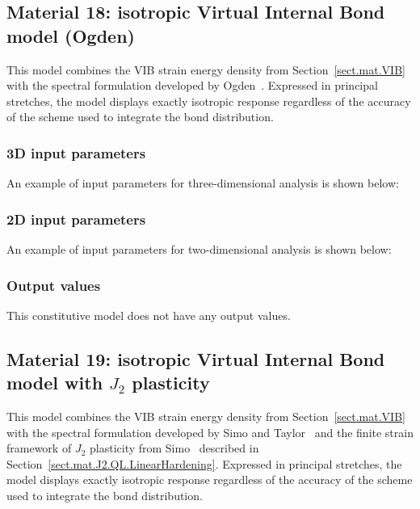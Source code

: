 \subsection{Material 18: isotropic Virtual Internal Bond model (Ogden)}
\label{sect.mat.VIB.Ogden}
This model combines the VIB strain energy density from
Section~\ref{sect.mat.VIB} with the
spectral formulation developed by Ogden~\cite{Ogden1983}.
Expressed in principal stretches, the model displays
exactly isotropic response regardless of the accuracy of the
scheme used to integrate the bond distribution.

\subsubsection{3D input parameters}
An example of input parameters for three-dimensional analysis is shown 
below:

\subsubsection{2D input parameters}
An example of input parameters for two-dimensional analysis is shown 
below:

\subsubsection{Output values}
This constitutive model does not have any output values.

\subsection{Material 19: isotropic Virtual Internal Bond model
with $J_{2}$ plasticity}
\label{sect.mat.VIB.Simo.J2}
This model combines the VIB strain energy density from
Section~\ref{sect.mat.VIB} with the
spectral formulation developed by Simo and Taylor~\cite{Simo1991}
and the finite strain framework of $J_{2}$ plasticity
from Simo~\cite{Simo1992} described in 
Section~\ref{sect.mat.J2.QL.LinearHardening}.
Expressed in principal stretches, the model displays
exactly isotropic response regardless of the accuracy of the
scheme used to integrate the bond distribution.

